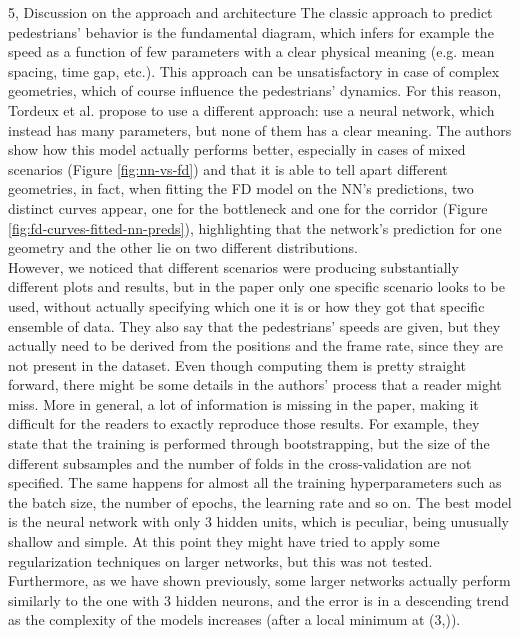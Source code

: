 \documentclass[10pt,a4paper]{article}
\begin{document}
\begin{task}{5, Discussion on the approach and architecture}
The classic approach to predict pedestrians' behavior is the fundamental diagram, which infers for example the speed as a function of few parameters with a clear physical meaning (e.g. mean spacing, time gap, etc.).
This approach can be unsatisfactory in case of complex geometries, which of course influence the pedestrians' dynamics.
For this reason, Tordeux et al. \cite{tordeux2018} propose to use a different approach: use a neural network, which instead has many parameters, but none of them has a clear meaning.
The authors show how this model actually performs better, especially in cases of mixed scenarios (Figure \ref{fig:nn-vs-fd}) and that it is able to tell apart different geometries, in fact, when fitting the FD model on the NN's predictions, two distinct curves appear, one for the bottleneck and one for the corridor (Figure \ref{fig:fd-curves-fitted-nn-preds}), highlighting that the network's prediction for one geometry and the other lie on two different distributions.\\
However, we noticed that different scenarios were producing substantially different plots and results, but in the paper only one specific scenario looks to be used, without actually specifying which one it is or how they got that specific ensemble of data.
They also say that the pedestrians' speeds are given, but they actually need to be derived from the positions and the frame rate, since they are not present in the dataset.
Even though computing them is pretty straight forward, there might be some details in the authors' process that a reader might miss.
More in general, a lot of information is missing in the paper, making it difficult for the readers to exactly reproduce those results.
For example, they state that the training is performed through bootstrapping, but the size of the different subsamples and the number of folds in the cross-validation are not specified.
The same happens for almost all the training hyperparameters such as the batch size, the number of epochs, the learning rate and so on.
The best model is the neural network with only 3 hidden units, which is peculiar, being unusually shallow and simple.
At this point they might have tried to apply some regularization techniques on larger networks, but this was not tested.
Furthermore, as we have shown previously, some larger networks actually perform similarly to the one with 3 hidden neurons, and the error is in a descending trend as the complexity of the models increases (after a local minimum at (3,)).

\end{task}
\end{document}
